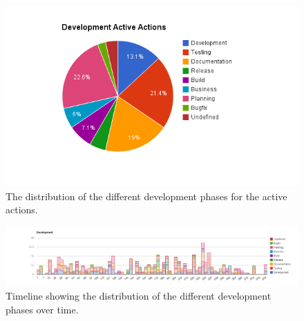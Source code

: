 \begin{figure}[!h]
	\centering
	\includegraphics[width=\textwidth, keepaspectratio]{figures/development-pa.png}
	\caption{The distribution of the different development phases for the active actions.}
	\label{figure:development-pa}
\end{figure}

\begin{figure}
	\centering
	\includegraphics[width=\textwidth, keepaspectratio]{figures/development-l.png}
	\caption{Timeline showing the distribution of the different development phases over time.}
	\label{figure:development-l}
\end{figure}
\clearpage

